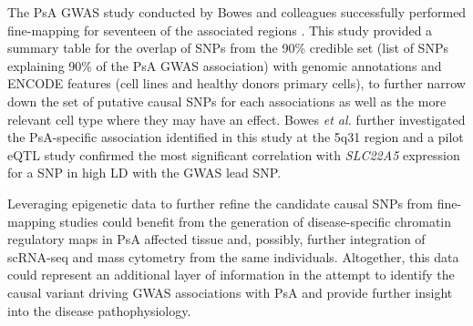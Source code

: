 The PsA GWAS study conducted by Bowes and colleagues successfully performed fine-mapping for seventeen of the associated regions \parencite{Bowes2016}. This study provided a summary table for the overlap of SNPs from the 90\% credible set (list of SNPs explaining 90\% of the PsA GWAS association) with genomic annotations and ENCODE features (cell lines and healthy donors primary cells), to further narrow down the set of putative causal SNPs for each associations as well as the more relevant cell type where they may have an effect. Bowes \textit{et al.} further investigated the PsA-specific association identified in this study at the 5q31 region and a pilot eQTL study confirmed the most significant correlation with \textit{SLC22A5} expression for a SNP in high LD with the GWAS lead SNP.

Leveraging epigenetic data to further refine the candidate causal SNPs from fine-mapping studies could benefit from the generation of disease-specific chromatin regulatory maps in PsA affected tissue and, possibly, further integration of scRNA-seq and mass cytometry from the same individuals. Altogether, this data could represent an additional layer of information in the attempt to identify the causal variant driving GWAS associations with PsA and provide further insight into the disease pathophysiology. 

%
%
%

